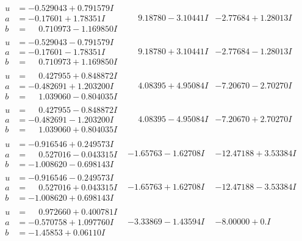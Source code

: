 \documentclass[1p]{elsarticle_modified}
\theoremstyle{definition}
\begin{document}
$$\begin{array}{c|c|c}
\begin{aligned}
u &= -0.529043 + 0.791579 I \\
a &= -0.17601 + 1.78351 I \\
b &= \phantom{-}0.710973 - 1.169850 I\end{aligned}
 & \phantom{-}9.18780 - 3.10441 I & -2.77684 + 1.28013 I \\ \hline\begin{aligned}
u &= -0.529043 - 0.791579 I \\
a &= -0.17601 - 1.78351 I \\
b &= \phantom{-}0.710973 + 1.169850 I\end{aligned}
 & \phantom{-}9.18780 + 3.10441 I & -2.77684 - 1.28013 I \\ \hline\begin{aligned}
u &= \phantom{-}0.427955 + 0.848872 I \\
a &= -0.482691 + 1.203200 I \\
b &= \phantom{-}1.039060 - 0.804035 I\end{aligned}
 & \phantom{-}4.08395 + 4.95084 I & -7.20670 - 2.70270 I \\ \hline\begin{aligned}
u &= \phantom{-}0.427955 - 0.848872 I \\
a &= -0.482691 - 1.203200 I \\
b &= \phantom{-}1.039060 + 0.804035 I\end{aligned}
 & \phantom{-}4.08395 - 4.95084 I & -7.20670 + 2.70270 I \\ \hline\begin{aligned}
u &= -0.916546 + 0.249573 I \\
a &= \phantom{-}0.527016 - 0.043315 I \\
b &= -1.008620 - 0.698143 I\end{aligned}
 & -1.65763 - 1.62708 I & -12.47188 + 3.53384 I \\ \hline\begin{aligned}
u &= -0.916546 - 0.249573 I \\
a &= \phantom{-}0.527016 + 0.043315 I \\
b &= -1.008620 + 0.698143 I\end{aligned}
 & -1.65763 + 1.62708 I & -12.47188 - 3.53384 I \\ \hline\begin{aligned}
u &= \phantom{-}0.972660 + 0.400781 I \\
a &= -0.570758 + 1.097760 I \\
b &= -1.45853 + 0.06110 I\end{aligned}
 & -3.33869 - 1.43594 I & -8.00000 + 0. I\phantom{ +0.000000I} \\ \hline\begin{aligned}

\end{aligned}
\end{array}$$
\end{document}
